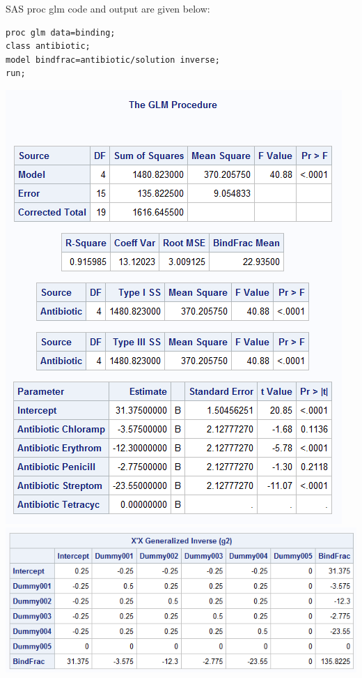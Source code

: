 \newpage

SAS proc glm code and output are given below:\\
\begin{small}
\begin{verbatim}
proc glm data=binding;
class antibiotic;
model bindfrac=antibiotic/solution inverse;
run;
\end{verbatim}
\end{small}

\begin{center}
\includegraphics[scale=0.75]{BindFracGLM}\\
\includegraphics[scale=0.75]{BindFracGLMInverse}
\end{center}

